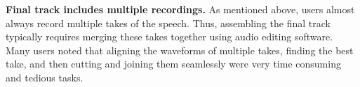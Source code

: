 \textbf{Final track includes multiple recordings.} As mentioned above, users almost always record multiple takes of the speech. Thus, assembling the final track typically requires merging these takes together using audio editing software. Many users noted that aligning the waveforms of multiple takes, finding the best take, and then cutting and joining them seamlessly were very time consuming and tedious tasks.

